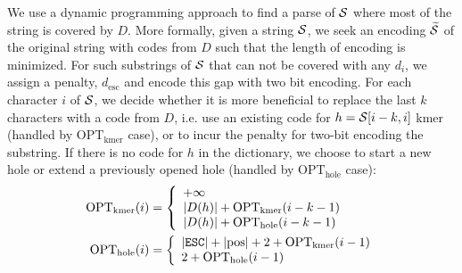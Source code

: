 \documentclass[12pt]{cmuthesis}
\begin{document}
  We use a dynamic programming approach to find a parse of $\mathcal{S}$ where most of the string is covered by $D$. More formally, given a string $\mathcal{S}$, we seek an encoding $\widetilde{\mathcal{S}}$ of the original string with codes from $D$ such that the length of encoding is minimized. For such substrings of $\mathcal{S}$ that can not be covered with any $d_i$, we assign a penalty, $d_{\mathrm{esc}}$ and encode this gap with two bit encoding. For each character $i$ of $\mathcal{S}$, we decide whether it is more beneficial to replace the last $k$ characters with a code from $D$, i.e. use an existing code for $h = \mathcal{S}[i-k,i]$ kmer (handled by $\mathrm{OPT_{kmer}}$ case), or to incur the penalty for two-bit encoding the substring. If there is no code for $h$ in the dictionary, we choose to start a new hole or extend a previously opened hole (handled by $\mathrm{OPT_{hole}}$ case):
  \begin{align}
  \mathrm{OPT_{kmer}}(i) & = \left \{
      \begin{array}{l l}
        + \infty \\
        |D(h)| + \mathrm{OPT_{kmer}}(i-k-1) \\
        |D(h)| + \mathrm{OPT_{hole}}(i-k-1) \\
      \end{array} \right. \\
  \mathrm{OPT_{hole}}(i) & = \left \{
      \begin{array}{l l}
        |\texttt{ESC}| + |\mathrm{pos}| + 2 + \mathrm{OPT_{kmer}}(i-1) \\
        2 + \mathrm{OPT_{hole}}(i-1) \\
      \end{array} \right.
    \label{eqn:denovo:twobit}
  \end{align}
\end{document}
